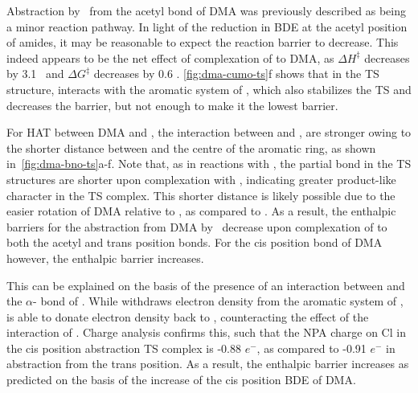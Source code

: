 Abstraction by \cumo\ from the acetyl  bond of DMA was previously
described as being a minor reaction pathway.\cite{Salamone2013} In light of the
reduction in BDE at the acetyl position of amides, it may be reasonable to
expect the reaction barrier to decrease. This indeed appears to be the net
effect of complexation of  to DMA, as $\Delta H^\ddagger$ decreases by
3.1 \kcalmol\ and $\Delta G^\ddagger$ decreases by 0.6 \kcalmol.
\ref{fig:dma-cumo-ts}f shows that in the TS structure,  interacts with
the aromatic system of \cumo, which also stabilizes the TS and decreases the
barrier, but not enough to make it the lowest barrier.

For HAT between DMA and \bno, the interaction between  and \bno, are
stronger owing to the shorter distance between  and the centre of the
aromatic ring, as shown in~\ref{fig:dma-bno-ts}a-f. Note that, as in reactions
with \cumo, the  partial bond in the TS structures are shorter upon
complexation with , indicating greater product-like character in the TS
complex. This shorter distance is likely possible due to the easier rotation of
DMA relative to \bno, as compared to \cumo. As a result, the enthalpic barriers
for the abstraction from DMA by \bno\ decrease upon complexation of  to
both the acetyl and trans position  bonds. For the cis position 
bond of DMA however, the enthalpic barrier increases.

This can be explained on the basis of the presence of an interaction between
 and the $\alpha$- bond of \bno. While  withdraws electron
density from the aromatic system of \bno,  is able to donate electron
density back to \bno, counteracting the effect of the interaction of .
Charge analysis confirms this, such that the NPA charge on Cl in the cis
position abstraction TS complex is -0.88 $e^-$, as compared to -0.91 $e^-$ in
abstraction from the trans position. As a result, the enthalpic barrier
increases as predicted on the basis of the increase of the cis position 
BDE of DMA.

